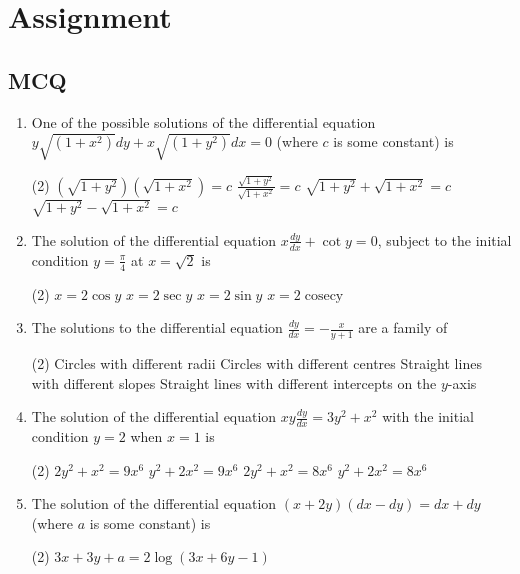 \chapter{Assignment}
\section{MCQ}
\begin{enumerate}
	\item One of the possible solutions of the differential equation
	$y \sqrt{\left(1+x^{2}\right)} d y+x \sqrt{\left(1+y^{2}\right)} d x=0$ (where $c$ is some constant) is
	 \begin{tasks}(2)
		\task[\textbf{a.}]$\left(\sqrt{1+y^{2}}\right)\left(\sqrt{1+x^{2}}\right)=c$
		\task[\textbf{b.}]$\frac{\sqrt{1+y^{2}}}{\sqrt{1+x^{2}}}=c$
		\task[\textbf{c.}]$\sqrt{1+y^{2}}+\sqrt{1+x^{2}}=c$
		\task[\textbf{d.}]  $\sqrt{1+y^{2}}-\sqrt{1+x^{2}}=c$
	\end{tasks}
	\item The solution of the differential equation $x \frac{d y}{d x}+\cot y=0$, subject to the initial condition $y=\frac{\pi}{4}$ at $x=\sqrt{2}$ is
	 \begin{tasks}(2)
		\task[\textbf{a.}]$x=2 \cos y$
		\task[\textbf{b.}]$x=2 \sec y$
		\task[\textbf{c.}]$x=2 \sin y$
		\task[\textbf{d.}]  $x=2 \operatorname{cosecy}$
	\end{tasks}
	\item The solutions to the differential equation $\frac{d y}{d x}=-\frac{x}{y+1}$ are a family of
	 \begin{tasks}(2)
		\task[\textbf{a.}]Circles with different radii
		\task[\textbf{b.}]Circles with different centres
		\task[\textbf{c.}]Straight lines with different slopes
		\task[\textbf{d.}] Straight lines with different intercepts on the $y$-axis
	\end{tasks}
	\item The solution of the differential equation $x y \frac{d y}{d x}=3 y^{2}+x^{2}$ with the initial condition $y=2$ when $x=1$ is
	 \begin{tasks}(2)
		\task[\textbf{a.}]$2 y^{2}+x^{2}=9 x^{6}$
		\task[\textbf{b.}] $y^{2}+2 x^{2}=9 x^{6}$
		\task[\textbf{c.}] $2 y^{2}+x^{2}=8 x^{6}$
		\task[\textbf{d.}] $y^{2}+2 x^{2}=8 x^{6}$
	\end{tasks}
	\item The solution of the differential equation
	$(x+2 y)(d x-d y)=d x+d y$ (where $a$ is some constant) is
	 \begin{tasks}(2)
		\task[\textbf{a.}]$3 x+3 y+a=2 \log (3 x+6 y-1)$

\end{tasks}
\end{enumerate}
